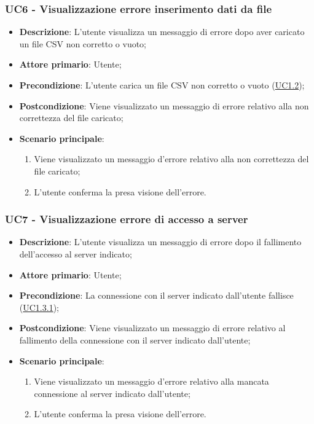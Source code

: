 \subsubsection{UC6 - Visualizzazione errore inserimento dati da file}
\label{sub:uc6}
\begin{itemize}
    \item \textbf{Descrizione}: L'utente visualizza un messaggio di errore dopo aver caricato un file CSV non corretto 
    o vuoto;

    \item \textbf{Attore primario}: Utente;
    
    \item \textbf{Precondizione}:   L'utente carica un file CSV non corretto o vuoto (\hyperref[ssub:uc1.2]{UC1.2});

    \item \textbf{Postcondizione}:  Viene visualizzato un messaggio di errore relativo alla non correttezza del file 
    caricato;

    \item \textbf{Scenario principale}:
    \begin{enumerate}
        \item Viene visualizzato un messaggio d'errore relativo alla non correttezza del file caricato;
        \item L'utente conferma la presa visione dell'errore.
    \end{enumerate}

\end{itemize}


\subsubsection{UC7 - Visualizzazione errore di accesso a server}
\label{sub:uc7}
\begin{itemize}
    \item \textbf{Descrizione}: L'utente visualizza un messaggio di errore dopo il fallimento dell'accesso
    al server indicato;

    \item \textbf{Attore primario}: Utente;
    
    \item \textbf{Precondizione}:   La connessione con il server indicato dall'utente fallisce 
    (\hyperref[par:uc1.3.1]{UC1.3.1});

    \item \textbf{Postcondizione}:  Viene visualizzato un messaggio di errore relativo al fallimento della connessione 
    con il server indicato dall'utente;

    \item \textbf{Scenario principale}:
    \begin{enumerate}
        \item Viene visualizzato un messaggio d'errore relativo alla mancata connessione al server indicato dall'utente;
        \item L'utente conferma la presa visione dell'errore.
    \end{enumerate}
\end{itemize}



